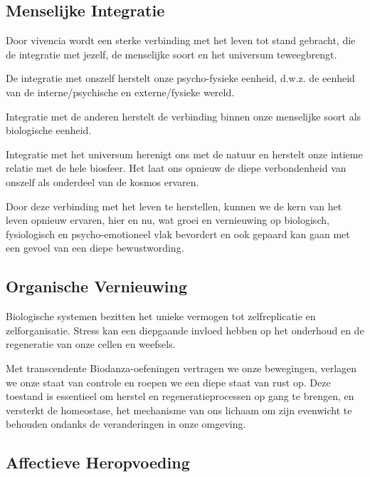 \documentclass[
  11pt,
]{book}
\begin{document}
\hypertarget{menselijke-integratie}{%
\subsection{Menselijke Integratie}\label{menselijke-integratie}}

Door vivencia wordt een sterke verbinding met het leven tot stand gebracht, die de integratie met jezelf, de menselijke soort en het universum teweegbrengt.

De integratie met onszelf herstelt onze psycho-fysieke eenheid, d.w.z. de eenheid van de interne/psychische en externe/fysieke wereld.

Integratie met de anderen herstelt de verbinding binnen onze menselijke soort als biologische eenheid.

Integratie met het universum herenigt ons met de natuur en herstelt onze intieme relatie met de hele biosfeer. Het laat ons opnieuw de diepe verbondenheid van onszelf als onderdeel van de kosmos ervaren.

Door deze verbinding met het leven te herstellen, kunnen we de kern van het leven opnieuw ervaren, hier en nu, wat groei en vernieuwing op biologisch, fysiologisch en psycho-emotioneel vlak bevordert en ook gepaard kan gaan met een gevoel van een diepe bewustwording.

\hypertarget{organische-vernieuwing}{%
\subsection{Organische Vernieuwing}\label{organische-vernieuwing}}

Biologische systemen bezitten het unieke vermogen tot zelfreplicatie en zelforganisatie. Stress kan een diepgaande invloed hebben op het onderhoud en de regeneratie van onze cellen en weefsels.

Met transcendente Biodanza-oefeningen vertragen we onze bewegingen, verlagen we onze staat van controle en roepen we een diepe staat van rust op. Deze toestand is essentieel om herstel en regeneratieprocessen op gang te brengen, en versterkt de homeostase, het mechanisme van ons lichaam om zijn evenwicht te behouden ondanks de veranderingen in onze omgeving.

\hypertarget{affectieve-heropvoeding}{%
\subsection{Affectieve Heropvoeding}\label{affectieve-heropvoeding}}
\end{document}
